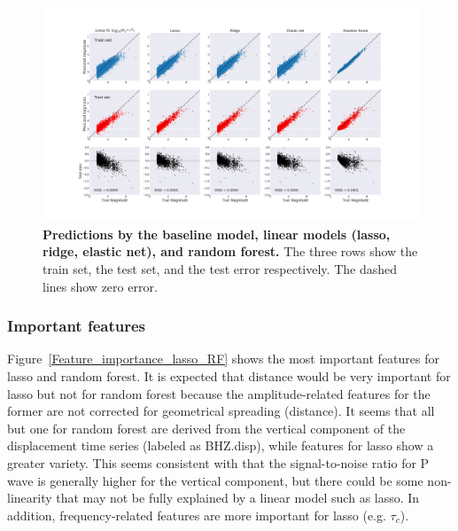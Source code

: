 \documentclass{article} %
\begin{document}
\begin{figure}[ht!]
	\centering
	\includegraphics*[scale=0.18, viewport= 85mm 40mm 800mm 460mm, angle=0]{./figure/prediction_vs_true.png}
	\caption{{\bf Predictions by the baseline model, linear models (lasso, ridge, elastic net), and random forest.} The three rows show the train set, the test set, and the test error respectively. The dashed lines show zero error.}\label{prediction_vs_true} 
\end{figure}




\subsubsection{Important features}
Figure~\ref{Feature_importance_lasso_RF} shows the most important features for lasso and random forest. It is expected that distance would be very important for lasso but not for random forest because the amplitude-related features for the former are not corrected for geometrical spreading (distance). It seems that all but one for random forest are derived from the vertical component of the displacement time series (labeled as BHZ.disp), while features for lasso show a greater variety. This seems consistent with that the signal-to-noise ratio for P wave is generally higher for the vertical component, but there could be some non-linearity that may not be fully explained by a linear model such as lasso. In addition, frequency-related features are more important for lasso (e.g. $\tau_c$).  
\end{document}
